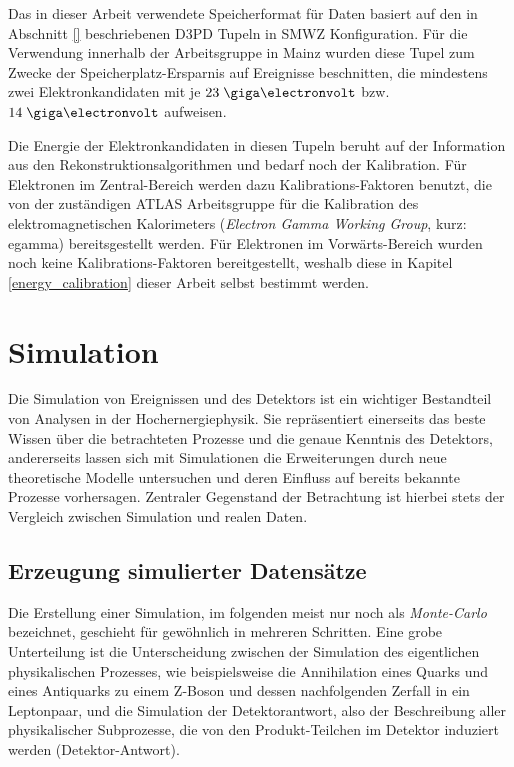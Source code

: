 Das in dieser Arbeit verwendete Speicherformat für Daten basiert auf den in
Abschnitt \ref{} beschriebenen D3PD Tupeln in SMWZ Konfiguration. Für die
Verwendung innerhalb der Arbeitsgruppe in Mainz wurden diese Tupel zum Zwecke
der Speicherplatz-Ersparnis auf Ereignisse beschnitten, die mindestens zwei
Elektronkandidaten mit je $23 \GeV$ bzw. $14 \GeV$ aufweisen.

Die Energie der Elektronkandidaten in diesen Tupeln beruht auf der Information
aus den Rekonstruktionsalgorithmen und bedarf noch der Kalibration. Für
Elektronen im Zentral-Bereich werden dazu Kalibrations-Faktoren benutzt, die
von der zuständigen ATLAS Arbeitsgruppe für die Kalibration des
elektromagnetischen Kalorimeters (\textit{Electron Gamma Working Group}, kurz:
egamma) bereitsgestellt werden. Für Elektronen im Vorwärts-Bereich wurden noch
keine Kalibrations-Faktoren bereitgestellt, weshalb diese in Kapitel
\ref{energy_calibration} dieser Arbeit selbst bestimmt werden.


\section{Simulation}
\label{data_sim_selection:simulation}


Die Simulation von Ereignissen und des Detektors ist ein wichtiger Bestandteil
von Analysen in der Hochernergiephysik. Sie repräsentiert einerseits das
beste Wissen über die betrachteten Prozesse und die genaue Kenntnis des
Detektors, andererseits lassen sich mit Simulationen die Erweiterungen durch
neue theoretische Modelle untersuchen und deren Einfluss auf bereits bekannte
Prozesse vorhersagen. Zentraler Gegenstand der Betrachtung ist hierbei stets
der Vergleich zwischen Simulation und realen Daten.



\subsection{Erzeugung simulierter Datensätze}
\label{event_generation}
Die Erstellung einer Simulation, im folgenden meist nur noch als
\textit{Monte-Carlo} bezeichnet, geschieht für gewöhnlich in mehreren
Schritten. Eine grobe Unterteilung ist die Unterscheidung zwischen der
Simulation des eigentlichen physikalischen Prozesses, wie beispielsweise die
Annihilation eines Quarks und eines Antiquarks zu einem Z-Boson und dessen
nachfolgenden Zerfall in ein Leptonpaar, und die Simulation der
Detektorantwort, also der Beschreibung aller physikalischer Subprozesse, die
von den Produkt-Teilchen im Detektor induziert werden (Detektor-Antwort).

